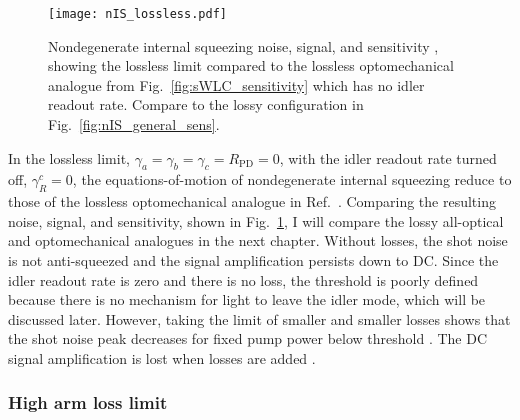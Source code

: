 \begin{figure}
	\centering
	\texttt{[image: nIS\_lossless.pdf]}
	\caption{  Nondegenerate internal squeezing noise, signal, and sensitivity , showing the lossless limit compared to the lossless optomechanical analogue from Fig.~\ref{fig:sWLC_sensitivity} which has no idler readout rate.  Compare to the lossy configuration in Fig.~\ref{fig:nIS_general_sens}.}
	\label{fig:nIS_lossless}
\end{figure}

In the lossless limit, $\gamma_a=\gamma_b=\gamma_c=R_\text{PD}=0$, with the idler readout rate turned off, $\gamma^c_R=0$, the equations-of-motion of nondegenerate internal squeezing reduce to those of the lossless optomechanical analogue in Ref.~\cite{Li2020}. Comparing the resulting noise, signal, and sensitivity, shown in Fig.~\ref{fig:nIS_lossless}, 
I will compare the lossy all-optical and optomechanical analogues in the next chapter. 
Without losses, the shot noise is not anti-squeezed and the signal amplification persists down to DC. Since the idler readout rate is zero and there is no loss, the threshold is poorly defined because there is no mechanism for light to leave the idler mode, which will be discussed later. However, taking the limit of smaller and smaller losses shows that the shot noise peak decreases for fixed pump power below threshold . The DC signal amplification is lost when losses are added .


\subsubsection{High arm loss limit}
\label{sec:nOPO_reduction}

